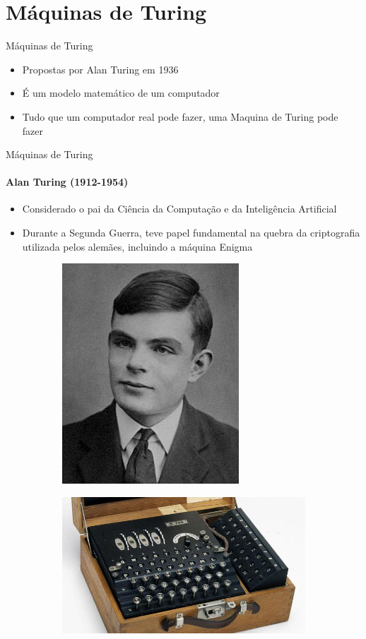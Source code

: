 \documentclass{beamer}
\begin{document}
\section{Máquinas de Turing}
\begin{frame}{Máquinas de Turing}
	\begin{itemize}
		\item Propostas por Alan Turing em 1936
		\item É um modelo matemático de um computador
		\item Tudo que um computador real pode fazer, uma Maquina de Turing pode fazer
	\end{itemize}
\end{frame}
\begin{frame}{Máquinas de Turing}
	\framesubtitle{Alan Turing (1912-1954)}
	\begin{itemize}
		\item Considerado o pai da Ciência da Computação e da Inteligência Artificial
		\item Durante a Segunda Guerra, teve papel fundamental na quebra da criptografia utilizada pelos alemães, incluindo a máquina Enigma
	\end{itemize}
	\begin{figure}
		\begin{subfigure}{0.5\textwidth}
			\includegraphics[width=0.2\paperwidth]{resources/alanturing}
		\end{subfigure}\begin{subfigure}{0.5\textwidth}
			\includegraphics[width=0.4\paperwidth]{resources/enigma}
		\end{subfigure}
	\end{figure}
\end{frame}
\end{document}
